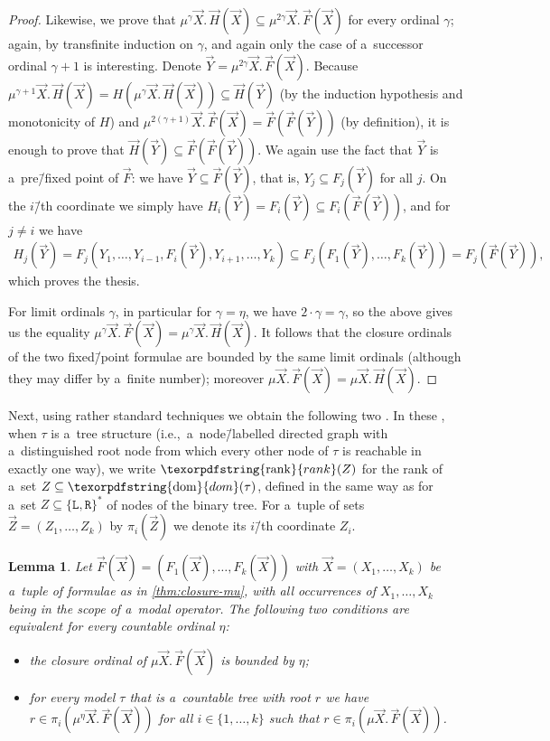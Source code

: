 \documentclass[11pt,a4paper]{amsart}
\theoremstyle{plain}
\newtheorem{lem}[thm]{Lemma}
\theoremstyle{definition}
\theoremstyle{defC}
\theoremstyle{thmC}
\theoremstyle{plain}
\numberwithin{equation}{section}
\numberwithin{equation}{section}
\numberwithin{figure}{section}
\newcommand{\ident}[1]{\ensuremath{\texorpdfstring{\mathrm{\mathnm{#1}}}{#1}}\xspace}
\newcommand{\dom}{\ident{dom}}
\newcommand{\dL}{\mathtt{{\scriptstyle L}}}
\newcommand{\dR}{\mathtt{{\scriptstyle R}}}
\newcommand{\mathnm}[1]{#1}
\newcommand{\rank}{\ident{rank}}
\begin{document}
\begin{proof}
	Likewise, we prove that $\mu^\gamma\vec{X}.\,\vec{H}(\vec{X})\subseteq\mu^{2\gamma}\vec{X}.\,\vec{F}(\vec{X})$ for every ordinal $\gamma$; again, by transfinite induction on $\gamma$,
	and again only the case of a~successor ordinal $\gamma+1$ is interesting.
	Denote $\vec{Y}=\mu^{2\gamma}\vec{X}.\,\vec{F}(\vec{X})$.
	Because $\mu^{\gamma+1}\vec{X}.\,\vec{H}(\vec{X})=H(\mu^\gamma\vec{X}.\,\vec{H}(\vec{X}))\subseteq \vec{H}(\vec{Y})$ (by the induction hypothesis and monotonicity of $H$)
	and $\mu^{2(\gamma+1)}\vec{X}.\,\vec{F}(\vec{X})=\vec{F}(\vec{F}(\vec{Y}))$ (by definition), it is enough to prove that $\vec{H}(\vec{Y})\subseteq\vec{F}(\vec{F}(\vec{Y}))$.
	We again use the fact that $\vec{Y}$ is a~pre\=/fixed point of $\vec{F}$: we have $\vec{Y}\subseteq\vec{F}(\vec{Y})$, that is, $Y_j\subseteq F_j(\vec{Y})$ for all $j$.
	On the $i$\=/th coordinate we simply have $H_i(\vec{Y})=F_i(\vec{Y})\subseteq F_i(\vec{F}(\vec{Y}))$,
	and for $j\neq i$ we have
	\begin{align*}
		H_j(\vec{Y})=F_j(Y_1,\dots,Y_{i-1},F_i(\vec{Y}),Y_{i+1},\dots,Y_k)\subseteq F_j(F_1(\vec{Y}),\dots,F_k(\vec{Y}))=F_j(\vec{F}(\vec{Y})),
	\end{align*}
	which proves the thesis.
	
	For limit ordinals $\gamma$, in particular for $\gamma=\eta$, we have $2\cdot\gamma=\gamma$, so the above gives us the equality $\mu^\gamma\vec{X}.\,\vec{F}(\vec{X})=\mu^\gamma\vec{X}.\,\vec{H}(\vec{X})$.
	It follows that the closure ordinals of the two fixed\=/point formulae are bounded by the same limit ordinals (although they may differ by a~finite number);
	moreover $\mu\vec{X}.\,\vec{F}(\vec{X})=\mu\vec{X}.\,\vec{H}(\vec{X})$.
\end{proof}

Next, using rather standard techniques we obtain the following two .
In these , when $\tau$ is a~tree structure (i.e.,~a~node\=/labelled directed graph with a~distinguished root node from which every other node of $\tau$ is reachable in exactly one way),
we write $\rank(Z)$ for the rank of a~set $Z\subseteq\dom(\tau)$, defined in the same way as for a~set $Z\subseteq\{\dL,\dR\}^\ast$ of nodes of the binary tree.
For a~tuple of sets $\vec{Z}=(Z_1,\dots,Z_k)$ by $\pi_i(\vec{Z})$ we denote its $i$\=/th coordinate $Z_i$.

\begin{lem}\label{lem:mu-tree1}
	Let $\vec{F}(\vec{X})=(F_1(\vec{X}),\dots,F_k(\vec{X}))$ with $\vec{X}=(X_1,\dots,X_k)$ be a~tuple of formulae as in \cref{thm:closure-mu}, with all occurrences of $X_1,\dots,X_k$ being in the scope of a~modal operator.
	The following two conditions are equivalent for every countable ordinal $\eta$:
	\begin{itemize}
	\item	the closure ordinal of $\mu \vec{X}.\,\vec{F}(\vec{X})$ is bounded by $\eta$;
	\item	for every model $\tau$ that is a~countable tree with root $r$ we have $r\in\pi_i(\mu^\eta\vec{X}.\,\vec{F}(\vec{X}))$ for all $i\in\{1,\dots,k\}$ such that $r\in\pi_i(\mu \vec{X}.\,\vec{F}(\vec{X}))$.
	\end{itemize}
\end{lem}
\end{document}

